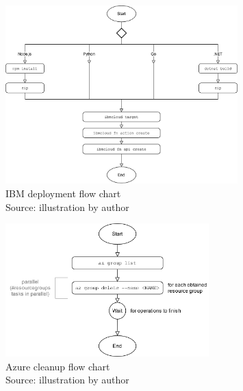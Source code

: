 \begin{figure}[htp]
\begin{center}
\includegraphics[width=0.8\textwidth]{bilder/IBM_Deploy_Flow.png}
\captionsetup{justification=centering, labelfont=bf}
\caption[IBM deployment flow chart]{IBM deployment flow chart\\Source: illustration by author}
\label{fig:ibm_deploy}
\end{center}
\end{figure}

\begin{figure}[htp]
\begin{center}
\includegraphics[width=0.7\textwidth]{bilder/Azure_Cleanup_Flow.png}
\captionsetup{justification=centering, labelfont=bf}
\caption[Azure cleanup flow chart]{Azure cleanup flow chart\\Source: illustration by author}
\label{fig:azure_cleanup}
\end{center}
\end{figure}

